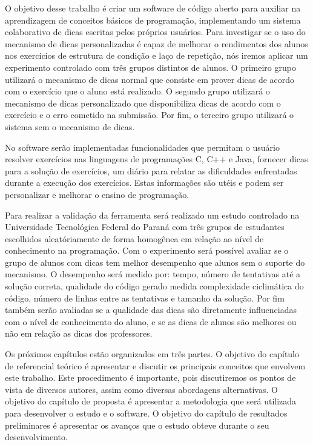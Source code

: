 O objetivo desse trabalho é criar um software de código aberto para auxiliar na aprendizagem de conceitos básicos de programação, implementando um sistema colaborativo de dicas escritas pelos próprios usuários. Para investigar se o uso do mecanismo de dicas personalizadas é capaz de melhorar o rendimentos dos alunos nos exercícios de estrutura de condição e laço de repetição, nós iremos aplicar um experimento controlado com três grupos distintos de alunos. O primeiro grupo utilizará o mecanismo de dicas normal que consiste em prover dicas de acordo com o exercício que o aluno está realizado. O segundo grupo utilizará o mecanismo de dicas personalizado que disponibiliza dicas de acordo com o exercício e o erro cometido na submissão. Por fim, o terceiro grupo utilizará o sistema sem o mecanismo de dicas.

No software serão implementadas funcionalidades que permitam o usuário resolver exercícios nas linguagens de programações C, C++ e Java, fornecer dicas para a solução de exercícios, um diário para relatar as dificuldades enfrentadas durante a execução dos exercícios. Estas informações são utéis e podem ser personalizar e melhorar o ensino de programação.

Para realizar a validação da ferramenta será realizado um estudo controlado na Universidade Tecnológica Federal do Paraná com três grupos de estudantes escolhidos aleatóriamente de forma homogênea em relação ao nível de conhecimento na programação. Com o experimento será possível avaliar se o grupo de alunos com dicas tem melhor desempenho que alunos sem o suporte do mecanismo. O desempenho será medido por: tempo, número de tentativas até a solução correta, qualidade do código gerado medida complexidade ciclimática do código, número de linhas entre as tentativas e tamanho da solução. Por fim também serão avaliadas se a qualidade das dicas são diretamente influenciadas com o nível de conhecimento do aluno, e se as dicas de alunos são melhores ou não em relação as dicas dos professores.

Os próximos capítulos estão organizados em três partes. O objetivo do capítulo de referencial teórico é apresentar e discutir os principais conceitos que envolvem este trabalho. Este  procedimento é importante, pois discutiremos os pontos de vista de diversos autores, assim como diversas abordagens alternativas. O objetivo do capítulo de proposta é apresentar a metodologia que será utilizada para desenvolver o estudo e o software. O objetivo do capítulo de resultados preliminares é apresentar os avanços que o estudo obteve durante o seu desenvolvimento.